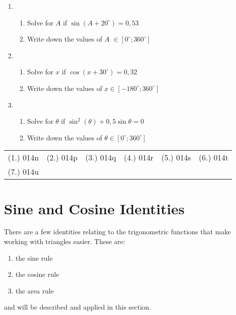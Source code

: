 {\begin{enumerate}
\begin{enumerate}
	\item Hence determine values of $\theta \in [0^\circ;720^\circ]$.
	\end{enumerate}
\item
	\begin{enumerate}
	\item Solve for $A$ if $\sin (A+20^\circ) = 0,53$
	\item Write down the values of $A$ $\in [0^\circ;360^\circ]$
	\end{enumerate}
\item
	\begin{enumerate}
	\item Solve for $x$ if $\cos (x+30^\circ) = 0,32$
	\item Write down the values of $x \in [-180^\circ;360^\circ]$
	\end{enumerate}
\item
	\begin{enumerate}
	\item Solve for $\theta$ if $\sin^2 (\theta) + 0,5\sin\theta = 0$
	\item Write down the values of $\theta \in [0^\circ;360^\circ]$
	\end{enumerate}
\end{enumerate}


\par \practiceinfo
\par \begin{tabular}[h]{cccccc}
(1.)	014n	&
(2.)	014p	&
(3.)	014q	&
(4.)	014r	&
(5.)	014s	&
(6.)	014t	\\ %
(7.)	014u	&
\end{tabular}}

\section{Sine and Cosine Identities}
There are a few identities relating to the trigonometric functions that make working with triangles easier. These are:
\begin{enumerate}
\item{the sine rule}
\item{the cosine rule}
\item{the area rule}
\end{enumerate}
and will be described and applied in this section.

